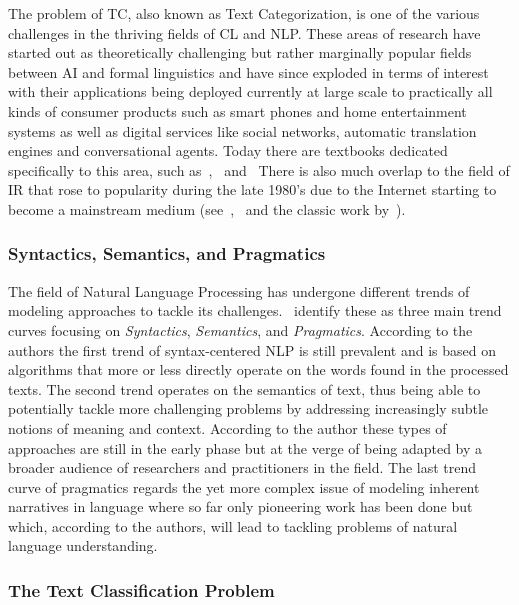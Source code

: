 The problem of \gls{TC}, also known as Text Categorization, is one of the various challenges in the thriving fields of \acrfull{CL} and \gls{NLP}. These areas of research have started out as theoretically challenging but rather marginally popular fields between \acrfull{AI} and formal linguistics and have since exploded in terms of interest with their applications being deployed currently at large scale to practically all kinds of consumer products such as smart phones and home entertainment systems as well as digital services like social networks, automatic translation engines and conversational agents.
Today there are textbooks dedicated specifically to this area, such as~\cite{Manning:1999aa},~\cite{Jurafsky:2014aa} and~\cite{Clark:2013aa} There is also much overlap to the field of \gls{IR} that rose to popularity during the late 1980's due to the Internet starting to become a mainstream medium (see~\cite{Manning:2008aa},~\cite{Leskovec:2014aa} and the classic work by~\cite{Rijsbergen:1979aa}).

\subsubsection*{Syntactics, Semantics, and Pragmatics}
\label{subs:Vogues in NLP: Syntactics, Semantics, and Pragmatics}

The field of Natural Language Processing has undergone different trends of modeling approaches to tackle its challenges.~\cite{Cambria:2014aa} identify these as three main trend curves focusing on \emph{Syntactics}, \emph{Semantics}, and \emph{Pragmatics}. According to the authors the first trend of syntax-centered NLP is still prevalent and is based on algorithms that more or less directly operate on the words found in the processed texts.
The second trend operates on the semantics of text, thus being able to potentially tackle more challenging problems by addressing increasingly subtle notions of meaning and context. According to the author these types of approaches are still in the early phase but at the verge of being adapted by a broader audience of researchers and practitioners in the field.
The last trend curve of pragmatics regards the yet more complex issue of modeling inherent narratives in language where so far only pioneering work has been done but which, according to the authors, will lead to tackling problems of natural language understanding.

\subsubsection*{The Text Classification Problem}
\label{subs:The Text Classification Problem}

